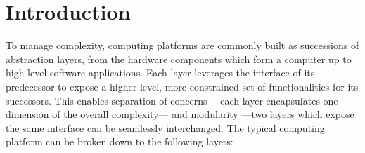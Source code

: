 \chapter{Introduction} \label{chapter:introduction}


\vspace{1cm}\noindent To manage complexity, computing platforms are commonly
built as successions of abstraction layers, from the hardware components which
form a computer up to high-level software applications.
%
Each layer leverages the interface of its predecessor to expose a higher-level,
more constrained set of functionalities for its successors.
%
This enables separation of concerns ---each layer encapsulates one dimension of
the overall complexity--- and modularity ---two layers which expose the same
interface can be seamlessly interchanged.
%
The typical computing platform can be broken down to the following layers:
%
